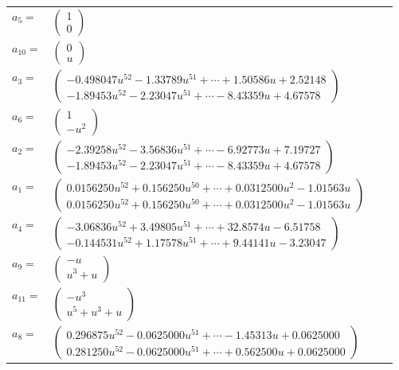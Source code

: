 \documentclass[1p]{elsarticle_modified}
\theoremstyle{definition}
\begin{document}
\begin{tabular}{m{7pt} m{180pt} m{7pt} m{180pt} }
\flushright $a_{5}=$&$\begin{pmatrix}1\\0\end{pmatrix}$ \\
\flushright $a_{10}=$&$\begin{pmatrix}0\\u\end{pmatrix}$ \\
\flushright $a_{3}=$&$\begin{pmatrix}-0.498047 u^{52}-1.33789 u^{51}+\cdots+1.50586 u+2.52148\\-1.89453 u^{52}-2.23047 u^{51}+\cdots-8.43359 u+4.67578\end{pmatrix}$ \\
\flushright $a_{6}=$&$\begin{pmatrix}1\\- u^2\end{pmatrix}$ \\
\flushright $a_{2}=$&$\begin{pmatrix}-2.39258 u^{52}-3.56836 u^{51}+\cdots-6.92773 u+7.19727\\-1.89453 u^{52}-2.23047 u^{51}+\cdots-8.43359 u+4.67578\end{pmatrix}$ \\
\flushright $a_{1}=$&$\begin{pmatrix}0.0156250 u^{52}+0.156250 u^{50}+\cdots+0.0312500 u^{2}-1.01563 u\\0.0156250 u^{52}+0.156250 u^{50}+\cdots+0.0312500 u^{2}-1.01563 u\end{pmatrix}$ \\
\flushright $a_{4}=$&$\begin{pmatrix}-3.06836 u^{52}+3.49805 u^{51}+\cdots+32.8574 u-6.51758\\-0.144531 u^{52}+1.17578 u^{51}+\cdots+9.44141 u-3.23047\end{pmatrix}$ \\
\flushright $a_{9}=$&$\begin{pmatrix}- u\\u^3+u\end{pmatrix}$ \\
\flushright $a_{11}=$&$\begin{pmatrix}- u^3\\u^5+u^3+u\end{pmatrix}$ \\
\flushright $a_{8}=$&$\begin{pmatrix}0.296875 u^{52}-0.0625000 u^{51}+\cdots-1.45313 u+0.0625000\\0.281250 u^{52}-0.0625000 u^{51}+\cdots+0.562500 u+0.0625000\end{pmatrix}$ \\

\end{tabular}
\end{document}
